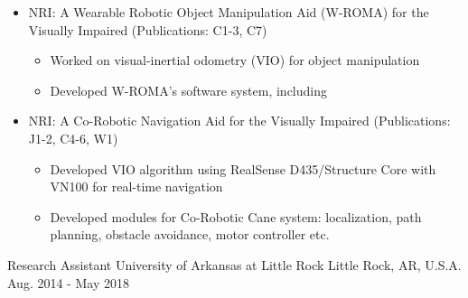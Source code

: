 \begin{cventries}
{%
      	  \vspace{-4.0mm}
      	\begin{justify}
      		\begin{itemize}[leftmargin=2ex, nosep, noitemsep]
      			\setlength{\parskip}{0pt}
      			\renewcommand{\labelitemi}{\bullet}
      			\item {NRI: A Wearable Robotic Object Manipulation Aid (W-ROMA) for the Visually Impaired (Publications: C1-3, C7)}
      			\begin{itemize}[leftmargin=3ex]
      				\scriptsize
      				\item {Worked on visual-inertial odometry (VIO) for object manipulation}
      				\item {Developed W-ROMA's software system, including  }
      			\end{itemize}
      			\item {NRI: A Co-Robotic Navigation Aid for the Visually Impaired (Publications: J1-2, C4-6, W1)}
      			\begin{itemize}[leftmargin=3ex]
      				\scriptsize
      				\item {Developed VIO algorithm using RealSense D435/Structure Core with VN100 for real-time navigation}
      				\item {Developed modules for Co-Robotic Cane system: localization, path planning, obstacle avoidance, motor controller etc.}
      			\end{itemize}
      		\end{itemize}
      	\end{justify}
      	\vspace{-4.0mm}  
     }
  \cventry
    {Research Assistant} %
    {University of Arkansas at Little Rock} %
    {Little Rock, AR, U.S.A.} %
    {Aug. 2014 - May 2018} %
    {
    	  \vspace{-4.0mm}
 \begin{justify}
 	\begin{itemize}[leftmargin=2ex, nosep, noitemsep]
 		\setlength{\parskip}{0pt}

\end{itemize}
\end{justify}}
\end{cventries}
